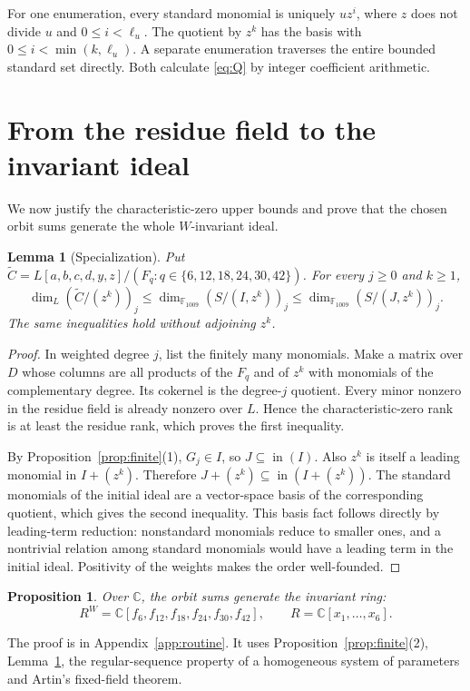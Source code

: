 \documentclass[11pt]{article}
\newtheorem{proposition}[theorem]{Proposition}
\newtheorem{lemma}[theorem]{Lemma}
\theoremstyle{definition}
\newcommand{\C}{\mathbb C}
\newcommand{\F}{\mathbb F}
\newcommand{\ini}{\operatorname{in}}
\newcommand{\degrees}{\{6,12,18,24,30,42\}}
\begin{document}
For one enumeration, every standard monomial is uniquely
$u z^i$, where $z$ does not divide $u$ and $0\leq i<\ell_u$.
The quotient by $z^k$ has the basis with
$0\leq i<\min(k,\ell_u)$. A separate enumeration traverses the entire
bounded standard set directly. Both calculate \eqref{eq:Q} by integer
coefficient arithmetic.

\section{From the residue field to the invariant ideal}\label{sec:specialize}
We now justify the characteristic-zero upper bounds and prove that
the chosen orbit sums generate the whole $W$-invariant ideal.

\begin{lemma}[Specialization]\label{lem:specialize}
Put $\widetilde C=L[a,b,c,d,y,z]/(F_q:q\in\degrees)$. For every
$j\geq0$ and $k\geq1$,
\[
 \dim_L(\widetilde C/(z^k))_j
       \leq\dim_{\F_{1009}}(S/(I,z^k))_j
       \leq\dim_{\F_{1009}}(S/(J,z^k))_j.
\]
The same inequalities hold without adjoining $z^k$.
\end{lemma}
\begin{proof}
In weighted degree $j$, list the finitely many monomials. Make a
matrix over $D$ whose columns are all products of the $F_q$ and of
$z^k$ with monomials of the complementary degree. Its cokernel is
the degree-$j$ quotient. Every minor nonzero in the residue field is
already nonzero over $L$. Hence the characteristic-zero rank is at
least the residue rank, which proves the first inequality.

By Proposition~\ref{prop:finite}(1), $G_j\in I$, so
$J\subseteq\ini(I)$. Also $z^k$ is itself a leading monomial in
$I+(z^k)$. Therefore
$J+(z^k)\subseteq\ini(I+(z^k))$. The standard monomials of the
initial ideal are a vector-space basis of the corresponding quotient,
which gives the second inequality. This basis fact follows directly
by leading-term reduction: nonstandard monomials reduce to smaller
ones, and a nontrivial relation among standard monomials would have
a leading term in the initial ideal. Positivity of the weights makes
the order well-founded.
\end{proof}

\begin{proposition}\label{prop:invariant-generation}
Over $\C$, the orbit sums generate the invariant ring:
\[
                   R^W=\C[f_6,f_{12},f_{18},f_{24},f_{30},f_{42}],
                \qquad R=\C[x_1,\ldots,x_6].
\]
\end{proposition}
The proof is in Appendix~\ref{app:routine}. It uses Proposition~\ref{prop:finite}(2),
Lemma~\ref{lem:specialize}, the regular-sequence property of a homogeneous
system of parameters and Artin's fixed-field theorem.
\end{document}
